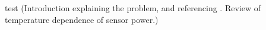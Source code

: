 test
(Introduction explaining the problem, and referencing \cite{Beck:2010zzd}.
Review of temperature dependence of sensor power.)
